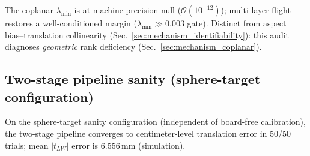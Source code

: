The coplanar $\lambda_{\min}$ is at machine-precision null ($\mathcal{O}(10^{-12})$);
multi-layer flight restores a well-conditioned margin ($\lambda_{\min}\gg 0.003$
gate).
Distinct from aspect bias--translation collinearity
(Sec.~\ref{sec:mechanism_identifiability}): this audit diagnoses \emph{geometric}
rank deficiency (Sec.~\ref{sec:mechanism_coplanar}).

\subsection{Two-stage pipeline sanity (sphere-target configuration)}
On the sphere-target sanity configuration (independent of board-free calibration), the
two-stage pipeline converges to centimeter-level translation error in 50/50 trials;
mean $|t_{LW}|$ error is 6.556\,mm (simulation).
